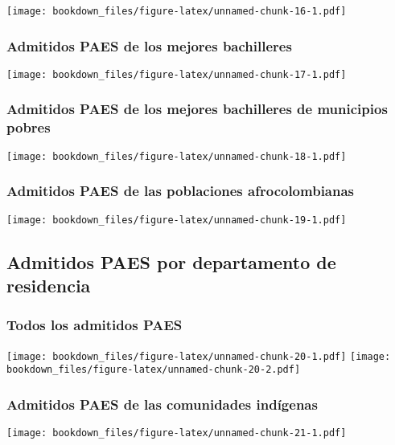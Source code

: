 \documentclass[]{article}
\theoremstyle{definition}
\theoremstyle{definition}
\theoremstyle{definition}
\theoremstyle{remark}
\begin{document}
\texttt{[image: bookdown\_files/figure-latex/unnamed-chunk-16-1.pdf]}

\subsubsection{Admitidos PAES de los mejores
bachilleres}\label{admitidos-paes-de-los-mejores-bachilleres}

\texttt{[image: bookdown\_files/figure-latex/unnamed-chunk-17-1.pdf]}

\subsubsection{Admitidos PAES de los mejores bachilleres de municipios
pobres}\label{admitidos-paes-de-los-mejores-bachilleres-de-municipios-pobres}

\texttt{[image: bookdown\_files/figure-latex/unnamed-chunk-18-1.pdf]}

\subsubsection{Admitidos PAES de las poblaciones
afrocolombianas}\label{admitidos-paes-de-las-poblaciones-afrocolombianas}

\texttt{[image: bookdown\_files/figure-latex/unnamed-chunk-19-1.pdf]}

\subsection{Admitidos PAES por departamento de
residencia}\label{admitidos-paes-por-departamento-de-residencia}

\subsubsection{Todos los admitidos
PAES}\label{todos-los-admitidos-paes-1}

\texttt{[image: bookdown\_files/figure-latex/unnamed-chunk-20-1.pdf]}
\texttt{[image: bookdown\_files/figure-latex/unnamed-chunk-20-2.pdf]}

\subsubsection{Admitidos PAES de las comunidades
indígenas}\label{admitidos-paes-de-las-comunidades-indigenas-1}

\texttt{[image: bookdown\_files/figure-latex/unnamed-chunk-21-1.pdf]}
\end{document}
